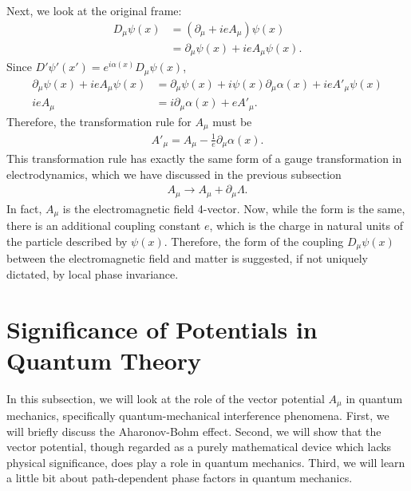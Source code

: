 \documentclass{book}
\numberwithin{equation}{section}
\theoremstyle{definition}
\newcommand{\p}{\partial}
\begin{document}
Next, we look at the original frame:
\begin{align}
D_\mu \psi(x) &= \left(\p_\mu + ieA_\mu \right)\psi(x)\\
&= \p_\mu\psi(x) + ieA_\mu \psi(x).
\end{align}
Since $D'\psi'(x') = e^{i\alpha(x)}D_\mu\psi(x)$,
\begin{align}
\p_\mu\psi(x) + ieA_\mu \psi(x) &= \p_\mu \psi(x) + i\psi(x)\p_\mu \alpha(x) + ie A'_\mu \psi(x)\\
ieA_\mu &= i\p_\mu \alpha(x) + e A'_\mu.
\end{align}
Therefore, the transformation rule for $A_\mu$ must be
\begin{align}
A'_\mu = A_\mu - \frac{1}{e}\p_\mu\alpha(x).
\end{align}
This transformation rule has exactly the same form of a gauge transformation in electrodynamics, which we have discussed in the previous subsection
\begin{align}
A_\mu \to A_\mu + \p_\mu \Lambda.
\end{align} 
In fact, $A_\mu$ is the electromagnetic field 4-vector. Now, while the form is the same, there is an additional coupling constant $e$, which is the charge in natural units of the particle described by $\psi(x)$. Therefore, the form of the coupling $D_\mu\psi(x)$ between the electromagnetic field and matter is suggested, if not uniquely dictated, by local phase invariance. 



\section{Significance of Potentials in Quantum Theory}
In this subsection, we will look at the role of the vector potential $A_\mu$ in quantum mechanics, specifically quantum-mechanical interference phenomena. First, we will briefly discuss the Aharonov-Bohm effect. Second, we will show that the vector potential, though regarded as a purely mathematical device which lacks physical significance, does play a role in quantum mechanics. Third, we will learn a little bit about path-dependent phase factors in quantum mechanics. 
\end{document}
